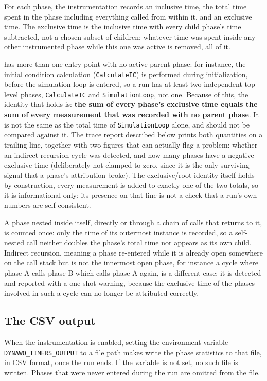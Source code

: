 \documentclass[a4paper, 12pt]{report}
\begin{document}
For each phase, the instrumentation records an inclusive time, the total time spent in the phase including everything called from within it, and an exclusive time. The exclusive time is the inclusive time with every child phase's time subtracted, not a chosen subset of children: whatever time was spent inside any other instrumented phase while this one was active is removed, all of it.

\Dynawo has more than one entry point with no active parent phase: for instance, the initial condition calculation (\texttt{CalculateIC}) is performed during initialization, before the simulation loop is entered, so a run has at least two independent top-level phases, \texttt{CalculateIC} and \texttt{SimulationLoop}, not one. Because of this, the identity that holds is: \textbf{the sum of every phase's exclusive time equals the sum of every measurement that was recorded with no parent phase}. It is not the same as the total time of \texttt{SimulationLoop} alone, and should not be compared against it. The trace report described below prints both quantities on a trailing line, together with two figures that can actually flag a problem: whether an indirect-recursion cycle was detected, and how many phases have a negative exclusive time (deliberately not clamped to zero, since it is the only surviving signal that a phase's attribution broke). The exclusive/root identity itself holds by construction, every measurement is added to exactly one of the two totals, so it is informational only; its presence on that line is not a check that a run's own numbers are self-consistent.

A phase nested inside itself, directly or through a chain of calls that returns to it, is counted once: only the time of its outermost instance is recorded, so a self-nested call neither doubles the phase's total time nor appears as its own child. Indirect recursion, meaning a phase re-entered while it is already open somewhere on the call stack but is not the innermost open phase, for instance a cycle where phase A calls phase B which calls phase A again, is a different case: it is detected and reported with a one-shot warning, because the exclusive time of the phases involved in such a cycle can no longer be attributed correctly.

\subsection{The CSV output}

When the instrumentation is enabled, setting the environment variable \texttt{DYNAWO\_TIMERS\_OUTPUT} to a file path makes \Dynawo write the phase statistics to that file, in CSV format, once the run ends. If the variable is not set, no such file is written. Phases that were never entered during the run are omitted from the file.
\end{document}
